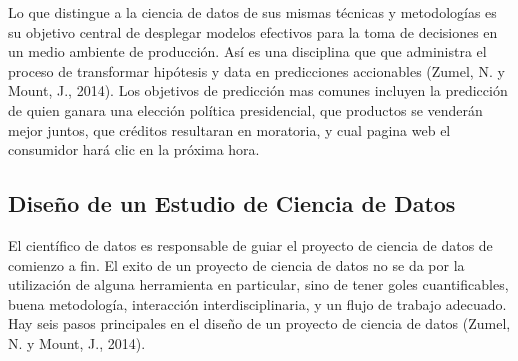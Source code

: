 \documentclass[letterpaper, spanish, 11pt]{report}
\begin{document}
Lo que distingue a la ciencia de datos de sus mismas técnicas y metodologías es su objetivo central de desplegar modelos efectivos para la toma de decisiones en un medio ambiente de producción. Así es una disciplina que que administra el proceso de transformar hipótesis y data en predicciones accionables (Zumel, N. y Mount, J., 2014). Los objetivos de predicción mas comunes incluyen la predicción de quien ganara una elección política presidencial, que productos se venderán mejor juntos, que créditos resultaran en moratoria, y cual pagina web el consumidor hará clic en la próxima hora. 

\subsection{Diseño de un Estudio de Ciencia de Datos}
El científico de datos es responsable de guiar el proyecto de ciencia de datos de comienzo a fin. El exito de un proyecto de ciencia de datos no se da por la utilización de alguna herramienta en particular, sino de tener goles cuantificables, buena metodología, interacción interdisciplinaria, y un flujo de trabajo adecuado. Hay seis pasos principales en el diseño de un proyecto de ciencia de datos (Zumel, N. y Mount, J., 2014).
\end{document}
